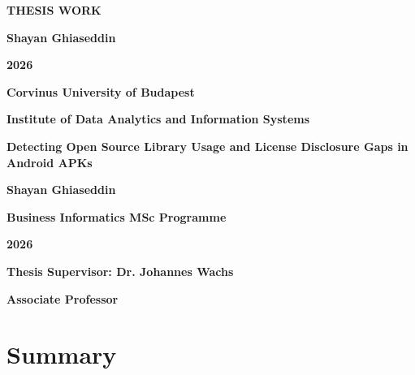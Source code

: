 \documentclass[12pt,a4paper]{report}
\begin{document}
\begin{titlepage}
    \centering
    \vspace*{0.38\textheight}
    {\fontsize{24.88}{38}\selectfont\bfseries THESIS WORK\par}
    \vfill
    \begin{flushright}
    {\fontsize{20.74}{24}\selectfont\bfseries Shayan Ghiaseddin\par}
    {\fontsize{20.74}{24}\selectfont\bfseries 2026\par}
    \end{flushright}
\end{titlepage}

\begin{titlepage}
    \begin{flushleft}
    {\fontsize{17.28}{20}\selectfont\bfseries Corvinus University of Budapest\par}
    {\fontsize{17.28}{20}\selectfont\bfseries Institute of Data Analytics and Information Systems\par}
    \end{flushleft}

    \vspace*{0.20\textheight}
    \centering
    {\fontsize{24.88}{30}\selectfont\bfseries Detecting Open Source Library Usage and License Disclosure Gaps in Android APKs\par}

    \vfill
    \begin{flushright}
    {\fontsize{17.28}{20}\selectfont\bfseries Shayan Ghiaseddin\par}
    {\fontsize{17.28}{20}\selectfont\bfseries Business Informatics MSc Programme\par}
    {\fontsize{17.28}{20}\selectfont\bfseries 2026\par}
    \vspace{1.2cm}
    {\fontsize{17.28}{20}\selectfont\bfseries Thesis Supervisor: Dr. Johannes Wachs\par}
    {\fontsize{17.28}{20}\selectfont\bfseries Associate Professor\par}
    \end{flushright}
\end{titlepage}

\tableofcontents

\listoffigures
\listoftables

\chapter*{Summary}
\end{document}
